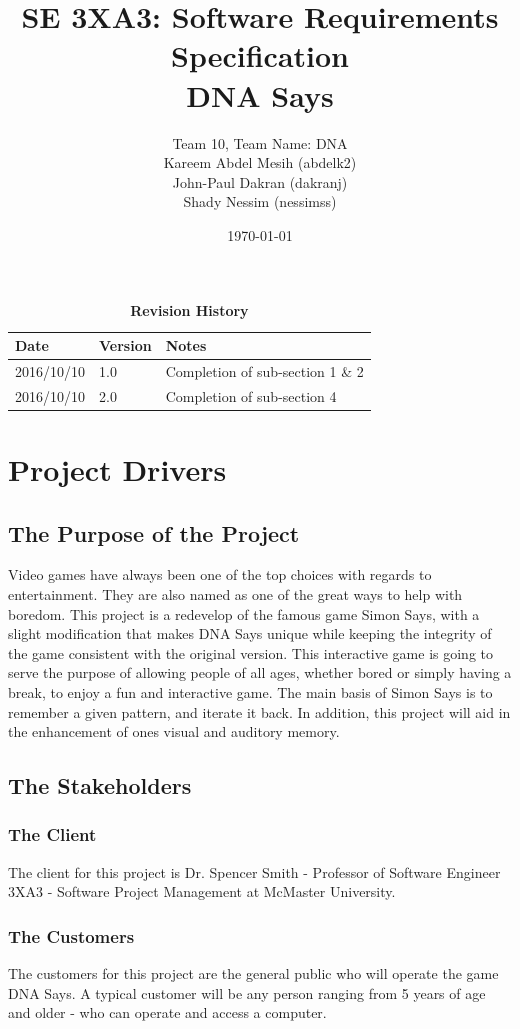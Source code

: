 \documentclass[12pt, titlepage]{article}
\title{SE 3XA3: Software Requirements Specification\\DNA Says}
\author{Team 10, Team Name: DNA
		\\ Kareem Abdel Mesih (abdelk2)
		\\ John-Paul Dakran (dakranj)
		\\ Shady Nessim (nessimss)
}
\date{\today}
\begin{document}
\maketitle
{}
\tableofcontents
\listoftables
\listoffigures
\begin{table}[bp]
\caption{\bf Revision History}
\begin{tabularx}{\textwidth}{p{3cm}p{2cm}X}
\toprule {\bf Date} & {\bf Version} & {\bf Notes}\\
\midrule
2016/10/10 & 1.0 & Completion of sub-section 1 \& 2\\
2016/10/10 & 2.0 & Completion of sub-section 4 \\
\bottomrule
\end{tabularx}
\end{table}
\newpage
{}


\section{Project Drivers}

\subsection{The Purpose of the Project}
Video games have always been one of the top choices with regards to entertainment. They are also named as one of the great ways to help with boredom. This project is a redevelop of the famous game Simon Says, with a slight modification that makes DNA Says unique while keeping the integrity of the game consistent with the original version. This interactive game is going to serve the purpose of allowing people of all ages, whether bored or simply having a break, to enjoy a fun and interactive game. The main basis of Simon Says is to remember a given pattern, and iterate it back. In addition, this project will aid in the enhancement of ones visual and auditory memory.
\subsection{The Stakeholders}

\subsubsection{The Client}
The client for this project is Dr. Spencer Smith - Professor of Software Engineer 3XA3 - Software Project Management at McMaster University.

\subsubsection{The Customers}
The customers for this project are the general public who will operate the game DNA Says. A typical customer will be any person ranging from 5 years of age and older - who can operate and access a computer. 
\end{document}
